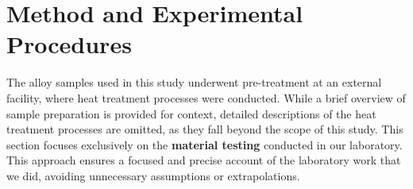 \documentclass{article}
\begin{document}
            
    \newpage\vspace*{-20pt}
\section{Method and Experimental Procedures}
The alloy samples used in this study underwent pre-treatment at an external facility, where heat treatment processes were conducted. While a brief overview of sample preparation is provided for context, detailed descriptions of the heat treatment processes are omitted, as they fall beyond the scope of this study. This section focuses exclusively on the \textbf{material testing} conducted in our laboratory.\\[8pt]
This approach ensures a focused and precise account of the laboratory work that we did, avoiding unnecessary assumptions or extrapolations.
\end{document}
